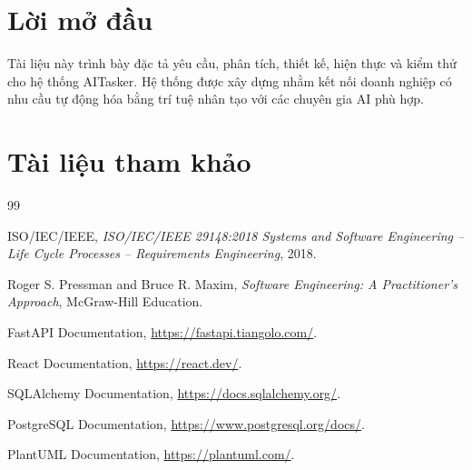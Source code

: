 \documentclass[12pt,a4paper,oneside]{report}
\begin{document}
\clearpage
{}
\setcounter{page}{1}

\chapter*{Lời mở đầu}

Tài liệu này trình bày đặc tả yêu cầu, phân tích, thiết kế, hiện thực và kiểm thử cho hệ thống AITasker. Hệ thống được xây dựng nhằm kết nối doanh nghiệp có nhu cầu tự động hóa bằng trí tuệ nhân tạo với các chuyên gia AI phù hợp.

\clearpage

\tableofcontents
\clearpage

\listoffigures
\clearpage

\listoftables
\clearpage

\setcounter{page}{1}









\clearpage
\chapter*{Tài liệu tham khảo}

\begin{thebibliography}{99}

ISO/IEC/IEEE,
\textit{ISO/IEC/IEEE 29148:2018 Systems and Software Engineering -- Life Cycle Processes -- Requirements Engineering},
2018.

Roger S. Pressman and Bruce R. Maxim,
\textit{Software Engineering: A Practitioner's Approach},
McGraw-Hill Education.

FastAPI Documentation,
\url{https://fastapi.tiangolo.com/}.

React Documentation,
\url{https://react.dev/}.

SQLAlchemy Documentation,
\url{https://docs.sqlalchemy.org/}.

PostgreSQL Documentation,
\url{https://www.postgresql.org/docs/}.

PlantUML Documentation,
\url{https://plantuml.com/}.

\end{thebibliography}
\end{document}
